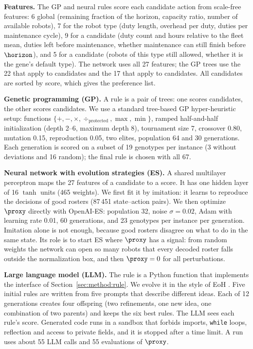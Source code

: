 \textbf{Features.}
The GP and neural rules score each candidate action from scale-free features:
6 global (\eg remaining fraction of the horizon, capacity ratio, number of available robots),
7 for the robot type (\eg duty length, overhead per duty, duties per maintenance cycle),
9 for a \reuse candidate (\eg duty count and hours relative to the fleet mean, duties left before maintenance, whether maintenance can still finish before $\horizon$),
and 5 for a \new candidate (\eg robots of this type still allowed, whether it is the gene's default type).
The network uses all 27 features; the GP trees use the 22 that apply to \reuse candidates and the 17 that apply to \new candidates.
All candidates are sorted by score, which gives the preference list.

\textbf{Genetic programming (GP).}
A rule is a pair of trees: one scores \reuse candidates, the other scores \new candidates.
We use a standard tree-based GP hyper-heuristic setup:
functions $\{+, -, \times, \div_{\text{protected}}, \max, \min\}$,
ramped half-and-half initialization (depth 2--6, maximum depth 8),
tournament size 7, crossover 0.80, mutation 0.15, reproduction 0.05, two elites,
population 64 and 30 generations.
Each generation is scored on a subset of 19 genotypes per instance (3 without deviations and 16 random);
the final rule is chosen with all 67.

\textbf{Neural network with evolution strategies (ES).}
A shared multilayer perceptron maps the 27 features of a candidate to a score.
It has one hidden layer of 16 $\tanh$ units (465 weights).
We first fit it by imitation: it learns to reproduce the decisions of good  rosters (87\,451 state--action pairs).
We then optimize $\proxy$ directly with OpenAI-ES:
population 32, noise $\sigma = 0.02$, Adam with learning rate 0.01, 60 generations, and 23 genotypes per instance per generation.
Imitation alone is not enough, because good rosters disagree on what to do in the same state.
Its role is to start ES where $\proxy$ has a signal:
from random weights the network can open so many robots that every decoded roster falls outside the normalization box, and then $\proxy = 0$ for all perturbations.

\textbf{Large language model (LLM).}
The rule is a Python function that implements the interface of Section~\ref{sec:method:rule}.
We evolve it in the style of EoH \cite{liu2024evolution}.
Five initial rules are written from five prompts that describe different ideas.
Each of 12 generations creates four offspring (two refinements, one new idea, one combination of two parents) and keeps the six best rules.
The LLM sees each rule's score.
Generated code runs in a sandbox that forbids imports, \texttt{while} loops, reflection and access to private fields, and it is stopped after a time limit.
A run uses about 55 LLM calls and 55 evaluations of $\proxy$.


